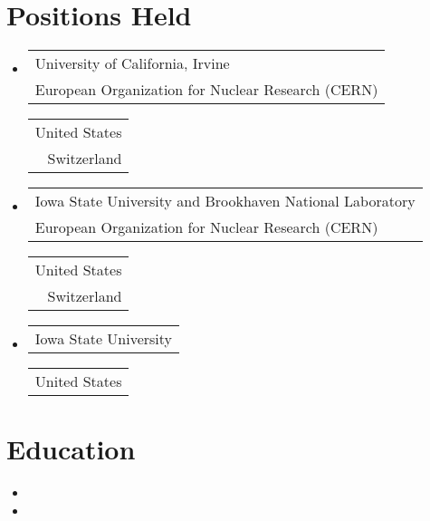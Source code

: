 \documentclass{myfancycv}
\begin{document}
\section{Positions Held}
\begin{itemize}

\item{%
%
{\hspace*{-0.6em}\begin{tabular}{l}University of California, Irvine \\ European Organization for Nuclear Research (CERN) \end{tabular}}%
{\begin{tabular}{r}United States \\ Switzerland \end{tabular}\hspace*{-0.6em}}%
{}%
{}%
}

\item{%
%
{\hspace*{-0.6em}\begin{tabular}{l}Iowa State University and Brookhaven National Laboratory \\ European Organization for Nuclear Research (CERN) \end{tabular}}%
{\begin{tabular}{r}United States \\Switzerland \end{tabular}\hspace*{-0.6em}}%
{}%
{}%
}

\item{%
%
{\hspace*{-0.6em}\begin{tabular}{l}Iowa State University \end{tabular}}%
{\begin{tabular}{r}United States \end{tabular}\hspace*{-0.6em}}%
{}%
{}%
}

\end{itemize}


\section{Education}

\begin{itemize}

\item{}

\item{}

\end{itemize}
\end{document}
